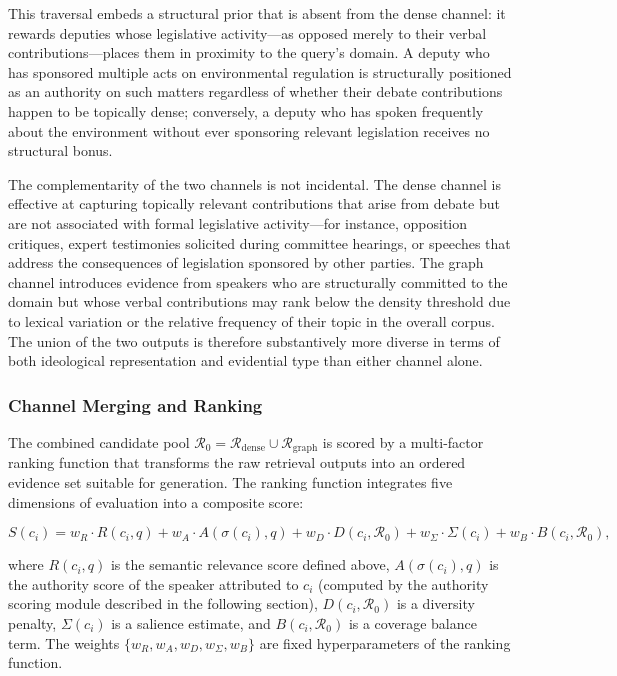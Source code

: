 This traversal embeds a structural prior that is absent from the dense channel: it rewards
deputies whose legislative activity---as opposed merely to their verbal contributions---places
them in proximity to the query's domain. A deputy who has sponsored multiple acts on environmental
regulation is structurally positioned as an authority on such matters regardless of whether their
debate contributions happen to be topically dense; conversely, a deputy who has spoken frequently
about the environment without ever sponsoring relevant legislation receives no structural bonus.

The complementarity of the two channels is not incidental. The dense channel is effective at
capturing topically relevant contributions that arise from debate but are not associated with
formal legislative activity---for instance, opposition critiques, expert testimonies solicited
during committee hearings, or speeches that address the consequences of legislation sponsored
by other parties. The graph channel introduces evidence from speakers who are structurally
committed to the domain but whose verbal contributions may rank below the density threshold due
to lexical variation or the relative frequency of their topic in the overall corpus. The union
of the two outputs is therefore substantively more diverse in terms of both ideological
representation and evidential type than either channel alone.

\subsubsection{Channel Merging and Ranking}
\label{sec:channel-merging}

The combined candidate pool $\mathcal{R}_0 = \mathcal{R}_\text{dense} \cup \mathcal{R}_\text{graph}$
is scored by a multi-factor ranking function that transforms the raw retrieval outputs into an
ordered evidence set suitable for generation. The ranking function integrates five dimensions of
evaluation into a composite score:

\begin{equation}
    S(c_i) = w_R \cdot R(c_i, q) + w_A \cdot A(\sigma(c_i), q) + w_D \cdot D(c_i, \mathcal{R}_0)
             + w_\Sigma \cdot \Sigma(c_i) + w_B \cdot B(c_i, \mathcal{R}_0),
\end{equation}

where $R(c_i, q)$ is the semantic relevance score defined above, $A(\sigma(c_i), q)$ is the
authority score of the speaker attributed to $c_i$ (computed by the authority scoring module
described in the following section), $D(c_i, \mathcal{R}_0)$ is a diversity penalty,
$\Sigma(c_i)$ is a salience estimate, and $B(c_i, \mathcal{R}_0)$ is a coverage balance term.
The weights $\{w_R, w_A, w_D, w_\Sigma, w_B\}$ are fixed hyperparameters of the ranking
function.


